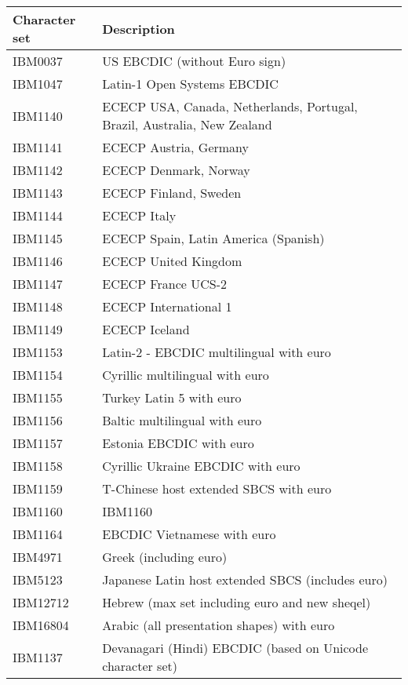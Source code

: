 \documentclass[letterpaper,10pt,english]{sphinxmanual}
\begin{document}
\begin{savenotes}\sphinxattablestart
\centering
\begin{tabulary}{\linewidth}[t]{|T|T|}
\hline
\sphinxstyletheadfamily 
Character set
&\sphinxstyletheadfamily 
Description
\\
\hline
IBM0037
&
US EBCDIC (without Euro sign)
\\
\hline
IBM1047
&
Latin-1 Open Systems EBCDIC
\\
\hline
IBM1140
&
ECECP USA, Canada, Netherlands, Portugal, Brazil, Australia, New Zealand
\\
\hline
IBM1141
&
ECECP Austria, Germany
\\
\hline
IBM1142
&
ECECP Denmark, Norway
\\
\hline
IBM1143
&
ECECP Finland, Sweden
\\
\hline
IBM1144
&
ECECP Italy
\\
\hline
IBM1145
&
ECECP Spain, Latin America (Spanish)
\\
\hline
IBM1146
&
ECECP United Kingdom
\\
\hline
IBM1147
&
ECECP France UCS-2
\\
\hline
IBM1148
&
ECECP International 1
\\
\hline
IBM1149
&
ECECP Iceland
\\
\hline
IBM1153
&
Latin-2 - EBCDIC multilingual with euro
\\
\hline
IBM1154
&
Cyrillic multilingual with euro
\\
\hline
IBM1155
&
Turkey Latin 5 with euro
\\
\hline
IBM1156
&
Baltic multilingual with euro
\\
\hline
IBM1157
&
Estonia EBCDIC with euro
\\
\hline
IBM1158
&
Cyrillic Ukraine EBCDIC with euro
\\
\hline
IBM1159
&
T-Chinese host extended SBCS with euro
\\
\hline
IBM1160
&
IBM1160
\\
\hline
IBM1164
&
EBCDIC Vietnamese with euro
\\
\hline
IBM4971
&
Greek (including euro)
\\
\hline
IBM5123
&
Japanese Latin host extended SBCS (includes euro)
\\
\hline
IBM12712
&
Hebrew (max set including euro and new sheqel)
\\
\hline
IBM16804
&
Arabic (all presentation shapes) with euro
\\
\hline
IBM1137
&
Devanagari (Hindi) EBCDIC (based on Unicode character set)
\\
\hline
\end{tabulary}
\par
\sphinxattableend\end{savenotes}
\end{document}
